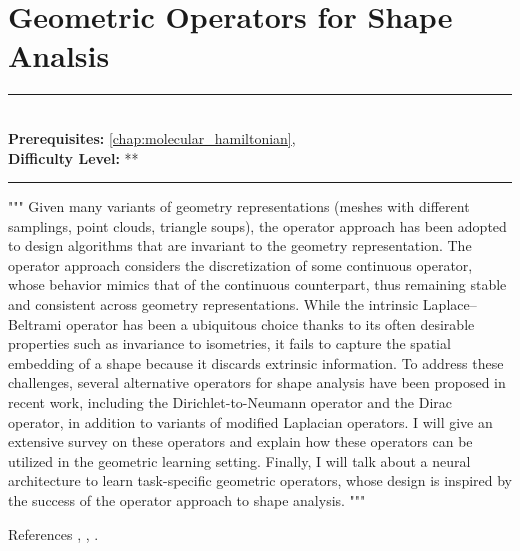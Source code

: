 \documentclass[book.tex]{subfiles}
\begin{document}
\chapter{Geometric Operators for Shape Analsis}
\label{chap:geometric_shape}
\noindent\rule{11cm}{0.4pt} \\
\textbf{Prerequisites:}  \autoref{chap:molecular_hamiltonian},   \\
\textbf{Difficulty Level:} ** \\
\noindent\rule{11cm}{0.4pt}
\vspace{5mm}

"""
Given many variants of geometry representations (meshes with different samplings, point clouds, triangle soups), the operator approach has been adopted to design algorithms that are invariant to the geometry representation. The operator approach considers the discretization of some continuous operator, whose behavior mimics that of the continuous counterpart, thus remaining stable and consistent across geometry representations. While the intrinsic Laplace–Beltrami operator has been a ubiquitous choice thanks to its often desirable properties such as invariance to isometries, it fails to capture the spatial embedding of a shape because it discards extrinsic information. To address these challenges, several alternative operators for shape analysis have been proposed in recent work, including the Dirichlet-to-Neumann operator and the Dirac operator, in addition to variants of modified Laplacian operators. I will give an extensive survey on these operators and explain how these operators can be utilized in the geometric learning setting. Finally, I will talk about a neural architecture to learn task-specific geometric operators, whose design is inspired by the success of the operator approach to shape analysis.
"""

References \cite{wang2018steklov}, \cite{wang2019intrinsic}, \cite{wang2019learning}.
\end{document}
